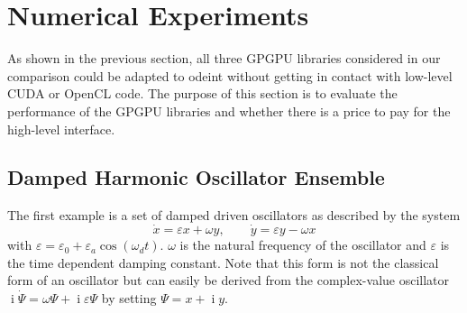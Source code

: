 \documentclass[final]{siamltex}
\newcommand {\ii} {\mathop{i}}
\begin{document}
%
%
\section{Numerical Experiments}

As shown in the previous section, all three GPGPU libraries considered
in our comparison could be adapted to odeint without getting in
contact with low-level CUDA or OpenCL code.  The purpose of this
section is to evaluate the performance of the GPGPU libraries and
whether there is a price to pay for the high-level interface.







%
%
\subsection{Damped Harmonic Oscillator Ensemble}

The first example is a set of damped driven oscillators as described by the system
\begin{equation} \label{eq:dampedsystem}
    \dot{x} =  \varepsilon x + \omega y , \quad \quad
    \dot{y} =  \varepsilon y - \omega x
\end{equation}
with $\varepsilon = \varepsilon_0 + \varepsilon_a \cos \left( \omega_d    %
t \right)$. $\omega$ is the natural frequency of the oscillator and
$\varepsilon$ is the time dependent damping constant.  Note that this form is
not the classical form of an oscillator but can easily be derived from the complex-value oscillator $\ii \dot{\Psi} = \omega \Psi + \ii \varepsilon \Psi$ by setting $\Psi = x + \ii y$.
\end{document}
